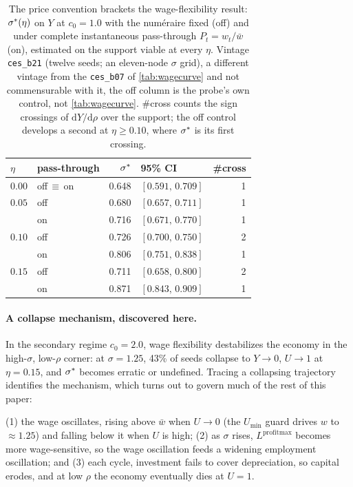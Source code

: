 \begin{table}[htbp]
\centering
\small
\caption{The price convention brackets the wage-flexibility result:
$\sigma^{\ast}(\eta)$ on $Y$ at $c_0 = 1.0$ with the numéraire fixed (off) and
under complete instantaneous pass-through $P_t = w_t/\bar w$ (on),
estimated on the support viable at every $\eta$. Vintage \texttt{ces\_b21}
(twelve seeds; an eleven-node $\sigma$ grid), a different vintage from the
\texttt{ces\_b07} of \cref{tab:wagecurve} and not commensurable with it, the
off column is the probe's own control, not \cref{tab:wagecurve}. \#cross
counts the sign crossings of $\mathrm{d}Y/\mathrm{d}\rho$ over the support; the
off control develops a second at $\eta \ge 0.10$, where $\sigma^{\ast}$ is its first
crossing.}
\label{tab:prices}
\begin{tabular}{llrlr}
\toprule
$\eta$ & pass-through & $\sigma^{\ast}$ & 95\% CI & \#cross\\
\midrule  %
$0.00$  & off\,$\equiv$\,on & 0.648 & $[0.591,\,0.709]$ & 1\\
$0.05$  & off               & 0.680 & $[0.657,\,0.711]$ & 1\\
        & on                & 0.716 & $[0.671,\,0.770]$ & 1\\
$0.10$  & off               & 0.726 & $[0.700,\,0.750]$ & 2\\
        & on                & 0.806 & $[0.751,\,0.838]$ & 1\\
$0.15$  & off               & 0.711 & $[0.658,\,0.800]$ & 2\\
        & on                & 0.871 & $[0.843,\,0.909]$ & 1\\
\bottomrule
\end{tabular}
\end{table}

\paragraph{A collapse mechanism, discovered here.}
In the secondary regime $c_0 = 2.0$, wage flexibility destabilizes the
economy in the high-$\sigma$, low-$\rho$ corner: at $\sigma = 1.25$, 43\% of
seeds collapse to $Y \to 0$, $U \to 1$ at $\eta = 0.15$, and $\sigma^{\ast}$ becomes
erratic or undefined. Tracing a collapsing trajectory identifies the
mechanism, which turns out to govern much of the rest of this paper:

(1) the wage oscillates, rising above $\bar w$ when $U \to 0$
(the $U_{\min}$ guard drives $w$ to $\approx 1.25$) and falling below it when
$U$ is high; (2) as $\sigma$ rises, $L^{\mathrm{profitmax}}$ becomes more
wage-sensitive, so the wage oscillation feeds a widening employment
oscillation; and (3) each cycle, investment fails to cover depreciation, so
capital erodes, and at low $\rho$ the economy eventually dies at $U = 1$.

